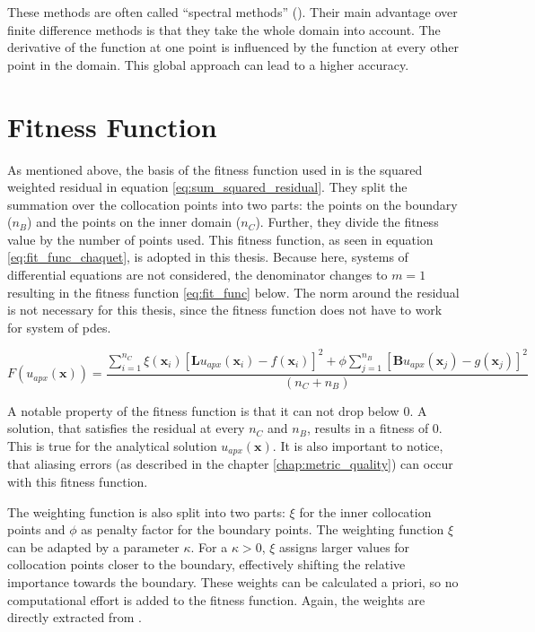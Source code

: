 \documentclass[./\jobname.tex]{subfiles}
\begin{document}
These methods are often called ``spectral methods'' (\cite{shen_spectral_2011}). Their main advantage over finite difference methods is that they take the whole domain into account. The derivative of the function at one point is influenced by the function at every other point in the domain. This global approach can lead to a higher accuracy. 

\section{Fitness Function}
\label{chap:fit_func}

As mentioned above, the basis of the fitness function used in \cite{chaquet_using_2019} is the squared weighted residual in equation \eqref{eq:sum_squared_residual}. They split the summation over the collocation points into two parts: the points on the boundary ($n_B$) and the points on the inner domain ($n_C$). Further, they divide the fitness value by the number of points used. This fitness function, as seen in equation \eqref{eq:fit_func_chaquet}, is adopted in this thesis. Because here, systems of differential equations are not considered, the denominator changes to $m=1$ resulting in the fitness function \eqref{eq:fit_func} below. The norm around the residual is not necessary for this thesis, since the fitness function does not have to work for system of \gls{pde}s.

\begin{equation}
\label{eq:fit_func}
F(u_{apx}(\mathbf{x})) = \frac{\sum_{i=1}^{n_C} \xi (\mathbf{x}_i) \left[ \mathbf{L}u_{apx}(\mathbf{x}_i) - f(\mathbf{x}_i) \right]^2 + \phi \sum_{j=1}^{n_B} \left[ \mathbf{B}u_{apx}(\mathbf{x}_j) - g(\mathbf{x}_j)\right]^2}{(n_C + n_B)}  
\end{equation}

A notable property of the fitness function is that it can not drop below 0. A solution, that satisfies the residual at every $n_C$ and $n_B$, results in a fitness of 0. This is true for the analytical solution $u_{apx}(\mathbf{x})$. It is also important to notice, that aliasing errors (as described in the chapter \ref{chap:metric_quality}) can occur with this fitness function. 

The weighting function is also split into two parts: $\xi$ for the inner collocation points and $\phi$ as penalty factor for the boundary points. The weighting function $\xi$ can be adapted by a parameter $\kappa$. For a $\kappa > 0$, $\xi$ assigns larger values for collocation points closer to the boundary, effectively shifting the relative importance towards the boundary. These weights can be calculated a priori, so no computational effort is added to the fitness function. Again, the weights are directly extracted from \cite{chaquet_using_2019}. 
\end{document}
